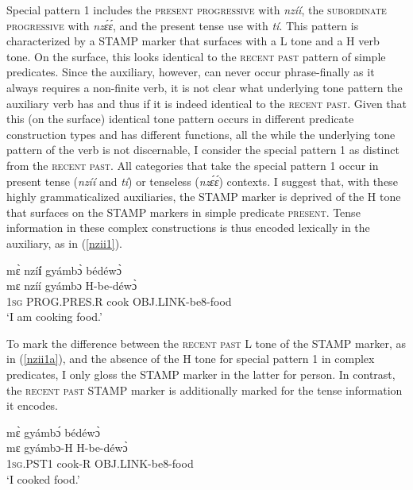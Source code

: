Special pattern 1 includes the \textsc{present progressive} with {\itshape nzíí}, the \textsc{subordinate progressive} with {\itshape nzɛ́ɛ́}, and the present tense use with {\itshape tí}. This pattern is characterized by a STAMP marker that surfaces with a L tone and a H verb tone. On the surface, this looks identical to the \textsc{recent past} pattern of simple predicates. Since the auxiliary, however, can never occur phrase-finally as it always requires a non-finite verb, it is not clear what underlying tone pattern the auxiliary verb has and thus if it is indeed identical to the \textsc{recent past}. Given that this (on the surface) identical tone pattern occurs in different predicate construction types and has different functions, all the while the underlying tone pattern of the verb is not discernable, I consider the special pattern 1 as distinct from the \textsc{recent past}.  All categories that take the special pattern 1 occur in present tense ({\itshape nzíí} and {\itshape tí}) or tenseless ({\itshape nzɛ́ɛ́}) contexts. I suggest that, with these highly grammaticalized auxiliaries, the STAMP marker is deprived of the H tone that surfaces on the STAMP markers in simple predicate \textsc{present}. Tense information in these complex constructions is thus encoded lexically in the auxiliary, as in (\ref{nzii1}).

\begin{exe} 
\ex\label{nzii1} 
  \glll  mɛ̀ nzí{\bfseries í} gyámbɔ̀ bédéwɔ̀ \\
         mɛ nzíí gyámbɔ H-be-déwɔ̀ \\
            1\textsc{sg} PROG.PRES.R cook OBJ.LINK-be8-food \\
    \trans `I am cooking food.'
\end{exe}

To mark the difference between the \textsc{recent past} L tone of the STAMP marker, as in (\ref{nzii1a}), and the absence of the H tone for special pattern 1 in complex predicates, I only gloss the STAMP marker in the latter for person. In contrast, the \textsc{recent past} STAMP marker is additionally marked for the tense information it encodes.

\begin{exe} 
\ex\label{nzii1a} 
  \glll  mɛ̀ gyámbɔ́ bédéwɔ̀ \\
         mɛ gyámbɔ-H H-be-déwɔ̀ \\
            1\textsc{sg}.PST1 cook-R OBJ.LINK-be8-food \\
    \trans `I cooked food.'
\end{exe}



